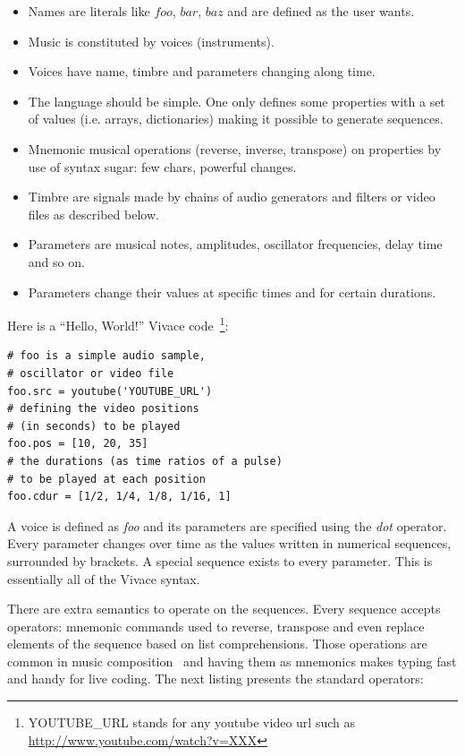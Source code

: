 \documentclass[12pt,times,twocolumn]{article}
\begin{document}
\begin{itemize}
	\item Names are literals like $foo$, $bar$, $baz$ and are defined as
	  the user wants.
	\item Music is constituted by voices (instruments).
	\item Voices have name, timbre and parameters changing along time.
	\item The language should be simple. One only defines some properties with a set of
	  values (i.e. arrays, dictionaries) making it possible to generate
	  sequences.
	\item Mnemonic musical operations (reverse, inverse, transpose) on
	  properties by use of syntax sugar: few chars, powerful changes.
	\item Timbre are signals made by chains of audio generators and
	  filters or video files as described below.
	\item Parameters are musical notes, amplitudes, oscillator
	  frequencies, delay time and so on.
	\item Parameters change their values at specific times and for certain
  durations.
\end{itemize}

Here is a ``Hello, World!'' Vivace code~\footnote{YOUTUBE\_URL
stands for any youtube video url such as \url{http://www.youtube.com/watch?v=XXX}}:

\begin{Verbatim}[fontfamily=courier, xleftmargin=\parindent,fontsize=\footnotesize]
# foo is a simple audio sample,
# oscillator or video file
foo.src = youtube('YOUTUBE_URL')
# defining the video positions
# (in seconds) to be played
foo.pos = [10, 20, 35]
# the durations (as time ratios of a pulse)
# to be played at each position
foo.cdur = [1/2, 1/4, 1/8, 1/16, 1]
\end{Verbatim}


A voice is defined as \textit{foo} and its parameters are specified
using the \textit{dot} operator. Every parameter changes over time as
the values written in numerical sequences, surrounded by brackets. A
special sequence exists to every parameter. This is essentially all of
the Vivace syntax.

There are extra semantics to operate on the sequences. Every sequence
accepts operators: mnemonic commands used to reverse, transpose and
even replace elements of the sequence based on list
comprehensions. Those operations are common in music composition~\cite{comp} and
having them as mnemonics makes typing fast and handy for live
coding. The next listing presents the standard operators:
\end{document}
